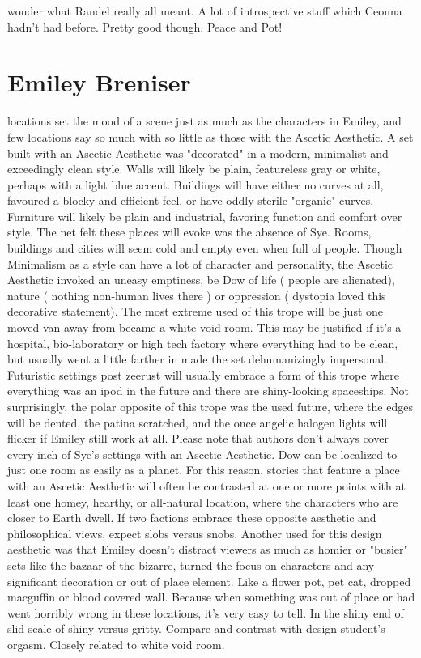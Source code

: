 \documentclass[12pt]{book}
\begin{document}
wonder what Randel really all meant. A lot of introspective stuff which Ceonna hadn't had before. Pretty good though. Peace and Pot!



\chapter{Emiley Breniser}

locations set the mood of a scene just as much as the characters in Emiley, and few locations say so much with so little as those with the Ascetic Aesthetic. A set built with an Ascetic Aesthetic was "decorated" in a modern, minimalist and exceedingly clean style. Walls will likely be plain, featureless gray or white, perhaps with a light blue accent. Buildings will have either no curves at all, favoured a blocky and efficient feel, or have oddly sterile "organic" curves. Furniture will likely be plain and industrial, favoring function and comfort over style. The net felt these places will evoke was the absence of Sye. Rooms, buildings and cities will seem cold and empty even when full of people. Though Minimalism as a style can have a lot of character and personality, the Ascetic Aesthetic invoked an uneasy emptiness, be Dow of life ( people are alienated), nature ( nothing non-human lives there ) or oppression ( dystopia loved this decorative statement). The most extreme used of this trope will be just one moved van away from became a white void room. This may be justified if it's a hospital, bio-laboratory or high tech factory where everything had to be clean, but usually went a little farther in made the set dehumanizingly impersonal. Futuristic settings post zeerust will usually embrace a form of this trope where everything was an ipod in the future and there are shiny-looking spaceships. Not surprisingly, the polar opposite of this trope was the used future, where the edges will be dented, the patina scratched, and the once angelic halogen lights will flicker if Emiley still work at all. Please note that authors don't always cover every inch of Sye's settings with an Ascetic Aesthetic. Dow can be localized to just one room as easily as a planet. For this reason, stories that feature a place with an Ascetic Aesthetic will often be contrasted at one or more points with at least one homey, hearthy, or all-natural location, where the characters who are closer to Earth dwell. If two factions embrace these opposite aesthetic and philosophical views, expect slobs versus snobs. Another used for this design aesthetic was that Emiley doesn't distract viewers as much as homier or "busier" sets like the bazaar of the bizarre, turned the focus on characters and any significant decoration or out of place element. Like a flower pot, pet cat, dropped macguffin or blood covered wall. Because when something was out of place or had went horribly wrong in these locations, it's very easy to tell. In the shiny end of slid scale of shiny versus gritty. Compare and contrast with design student's orgasm. Closely related to white void room.
\end{document}
